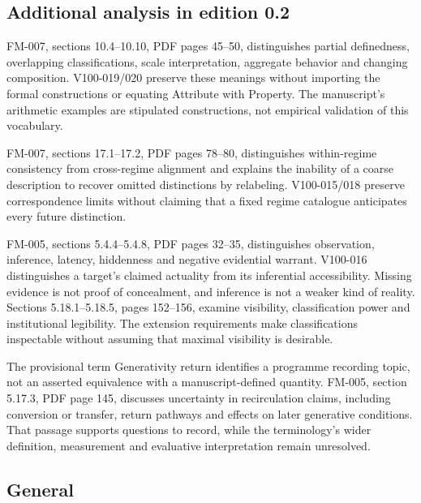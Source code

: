 \documentclass[11pt,a4paper]{article}
\begin{document}
\subsection{Additional analysis in edition 0.2}
FM-007, sections 10.4--10.10, PDF pages 45--50, distinguishes partial definedness, overlapping classifications, scale interpretation, aggregate behavior and changing composition. V100-019/020 preserve these meanings without importing the formal constructions or equating Attribute with Property. The manuscript's arithmetic examples are stipulated constructions, not empirical validation of this vocabulary.

FM-007, sections 17.1--17.2, PDF pages 78--80, distinguishes within-regime consistency from cross-regime alignment and explains the inability of a coarse description to recover omitted distinctions by relabeling. V100-015/018 preserve correspondence limits without claiming that a fixed regime catalogue anticipates every future distinction.

FM-005, sections 5.4.4--5.4.8, PDF pages 32--35, distinguishes observation, inference, latency, hiddenness and negative evidential warrant. V100-016 distinguishes a target's claimed actuality from its inferential accessibility. Missing evidence is not proof of concealment, and inference is not a weaker kind of reality. Sections 5.18.1--5.18.5, pages 152--156, examine visibility, classification power and institutional legibility. The extension requirements make classifications inspectable without assuming that maximal visibility is desirable.

The provisional term Generativity return identifies a programme recording topic, not an asserted equivalence with a manuscript-defined quantity. FM-005, section 5.17.3, PDF page 145, discusses uncertainty in recirculation claims, including conversion or transfer, return pathways and effects on later generative conditions. That passage supports questions to record, while the terminology's wider definition, measurement and evaluative interpretation remain unresolved.
\subsection{General}
\end{document}
